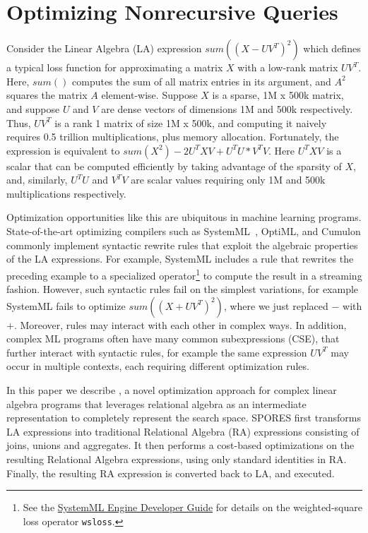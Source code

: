 \chapter{Optimizing Nonrecursive Queries}
\label{chapter:spores}


Consider the Linear Algebra (LA) expression $sum((X-UV^T)^2)$ which
defines a typical loss function for approximating a matrix $X$ with a
low-rank matrix $UV^T$. Here, $sum()$ computes the sum of all matrix
entries in its argument, and $A^2$ squares the matrix $A$
element-wise. Suppose $X$ is a sparse, 1M x 500k matrix, and suppose
$U$ and $V$ are dense vectors of dimensions 1M and 500k respectively.
Thus, $UV^T$ is a rank 1 matrix of size 1M x 500k, and computing it
naively requires 0.5 trillion multiplications, plus memory allocation.
Fortunately, the expression is equivalent to
$sum(X^2) - 2U^TXV + U^TU * V^TV$.  Here $U^TXV$ is a scalar that can
be computed efficiently by taking advantage of the sparsity of $X$,
and, similarly, $U^TU$ and $V^TV$ are scalar values requiring only 1M
and 500k multiplications respectively.

Optimization opportunities like this are ubiquitous in machine
learning programs. State-of-the-art optimizing compilers such as
SystemML~\cite{DBLP:reference/bdt/Boehm19},
OptiML\cite{DBLP:conf/icml/SujeethLBRCWAOO11}, and
Cumulon\cite{DBLP:conf/sigmod/HuangB013} commonly implement syntactic
rewrite rules that exploit the algebraic properties of the LA
expressions. For example, SystemML includes a rule that rewrites the
preceding example to a specialized operator\footnote{See the
  \href{https://systemml.apache.org/docs/0.12.0/engine-dev-guide.html}{SystemML
    Engine Developer Guide} for details on the weighted-square loss
  operator \texttt{wsloss}. } to compute the result in a streaming
fashion.  However, such syntactic rules fail on the simplest
variations, for example SystemML fails to optimize $sum((X+UV^T)^2)$,
where we just replaced $-$ with $+$.  Moreover, rules may interact
with each other in complex ways.  In addition, complex ML programs
often have many common subexpressions (CSE), that further interact
with syntactic rules, for example the same expression $UV^T$ may occur
in multiple contexts, each requiring different optimization rules.

In this paper we describe \sys, a novel optimization approach for
complex linear algebra programs that leverages relational algebra as
an intermediate representation to completely represent the search
space. SPORES first transforms LA expressions into traditional
Relational Algebra (RA) expressions consisting of joins, unions 
and aggregates.  It then performs a cost-based optimizations on
the resulting Relational Algebra expressions, using only standard
identities in RA.  Finally, the resulting RA expression is converted
back to LA, and executed.

